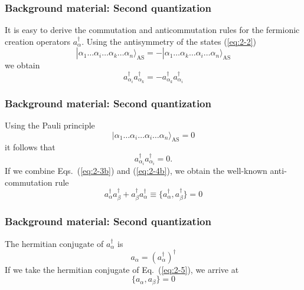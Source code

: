 \documentclass[compress]{beamer}
\newcommand*{\ket}[1]{|#1\rangle}
\begin{document}
\frame
{
  \frametitle{Background material: Second quantization}
\begin{small}
{\scriptsize
It is easy to derive the commutation and anticommutation rules  for the fermionic creation operators 
$a_\alpha^\dagger$. Using the antisymmetry of the states 
(\ref{eq:2-2})
\begin{equation}
	\ket{\alpha_1\dots \alpha_i\dots \alpha_k\dots \alpha_n}_{\mathrm{AS}} = 
		- \ket{\alpha_1\dots \alpha_k\dots \alpha_i\dots \alpha_n}_{\mathrm{AS}} \label{eq:2-3a}
\end{equation}
we obtain
\begin{equation}
	 a_{\alpha_i}^\dagger  a_{\alpha_k}^\dagger = - a_{\alpha_k}^\dagger a_{\alpha_i}^\dagger \label{eq:2-3b}
\end{equation}
}
\end{small}
}

\frame
{
  \frametitle{Background material: Second quantization}
\begin{small}
{\scriptsize
Using the Pauli principle
\begin{equation}
	\ket{\alpha_1\dots \alpha_i\dots \alpha_i\dots \alpha_n}_{\mathrm{AS}} = 0 \label{eq:2-4a}
\end{equation}
it follows that
\begin{equation}
	a_{\alpha_i}^\dagger  a_{\alpha_i}^\dagger = 0. \label{eq:2-4b}
\end{equation}
If we combine Eqs.~(\ref{eq:2-3b}) and (\ref{eq:2-4b}), we obtain the well-known anti-commutation rule
\begin{equation}
	a_{\alpha}^\dagger  a_{\beta}^\dagger + a_{\beta}^\dagger  a_{\alpha}^\dagger \equiv 
		\{a_{\alpha}^\dagger,a_{\beta}^\dagger\} = 0 \label{eq:2-5}
\end{equation}
}
\end{small}
}

\frame
{
  \frametitle{Background material: Second quantization}
\begin{small}
{\scriptsize
The hermitian conjugate  of $a_\alpha^\dagger$ is
\begin{equation}
	a_{\alpha} = ( a_{\alpha}^\dagger )^\dagger \label{eq:2-6}
\end{equation}
If we take the hermitian conjugate of Eq.~(\ref{eq:2-5}), we arrive at 
\begin{equation}
	\{a_{\alpha},a_{\beta}\} = 0 \label{eq:2-7}
\end{equation}
}
\end{small}
}
\end{document}
